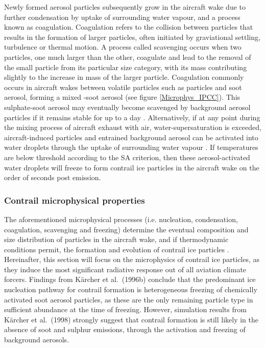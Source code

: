 Newly formed aerosol particles subsequently grow in the aircraft wake due to further condensation by uptake of surrounding water vapour, and a process known as coagulation. Coagulation refers to the collision between particles that results in the formation of larger particles, often initiated by graviational settling, turbulence or thermal motion. A process called scavenging occurs when two particles, one much larger than the other, coagulate and lead to the removal of the small particle from its particular size category, with its mass contributing slightly to the increase in mass of the larger particle. Coagulation commonly occurs in aircraft wakes between volatile particles such as  particles and soot aerosol, forming a mixed -soot aerosol (see figure \ref{Microphys_IPCC}). This sulphate-soot aerosol may eventually become scavenged by background aerosol particles if it remains stable for up to a day \cite{IPCC1999}. Alternatively, if at any point during the mixing process of aircraft exhaust with air, water-supersaturation is exceeded, aircraft-induced particles and entrained background aerosol can be activated into water droplets through the uptake of surrounding water vapour \cite{Karcher2018}. If temperatures are below threshold according to the SA criterion, then these aerosol-activated water droplets will freeze to form contrail ice particles in the aircraft wake on the order of seconds post emission. 

\subsubsection{Contrail microphysical properties}
The aforementioned microphysical processes (i.e. nucleation, condensation, coagulation, scavenging and freezing) determine the eventual composition and size distribution of particles in the aircraft wake, and if thermodynamic conditions permit, the formation and evolution of contrail ice particles \cite{AIR5715, Karcher2015}. Hereinafter, this section will focus on the microphysics of contrail ice particles, as they induce the most significant radiative response out of all aviation climate forcers. Findings from K{\"a}rcher et al.\ (1996b) \cite{Karcher1996b} conclude that the predominant ice nucleation pathway for contrail formation is heterogeneous freezing of chemically activated soot aerosol particles, as these are the only remaining particle type in sufficient abundance at the time of freezing. However, simulation results from K{\"a}rcher et al.\ (1998) \cite{Karcher1998} strongly suggest that contrail formation is still likely in the absence of soot and sulphur emissions, through the activation and freezing of background aerosols. 

